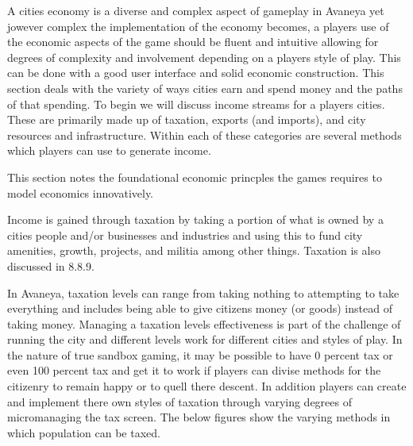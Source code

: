 


A cities economy is a diverse and complex aspect of gameplay in Avaneya yet jowever complex the implementation of the economy becomes, a players use of the economic aspects of the game should be fluent and intuitive allowing for degrees of complexity and involvement depending on a players style of play. This can be done with a good user interface and solid economic construction. This section deals with the variety of ways cities earn and spend money and the paths of that spending. To begin we will discuss income streams for a players cities. These are primarily made up of taxation, exports (and imports), and city resources and infrastructure. Within each of these categories are several methods which players can use to generate income.


This section notes the foundational economic princples the games requires to model economics innovatively. 













Income is gained through taxation by taking a portion of what is owned by a cities people and/or businesses and industries and using this to fund city amenities, growth, projects, and militia among other things. Taxation is also discussed in 8.8.9.

In Avaneya, taxation levels can range from taking nothing to attempting to take everything and includes being able to give citizens money (or goods) instead of taking money. Managing a taxation levels effectiveness is part of the challenge of running the city and different levels work for different cities and styles of play. In the nature of true sandbox gaming, it may be possible to have 0 percent tax or even 100 percent tax and get it to work if players can divise methods for the citizenry to remain happy or to quell there descent. In addition players can create and implement there own styles of taxation through varying degrees of micromanaging the tax screen. The below figures show the varying methods in which population can be taxed.

